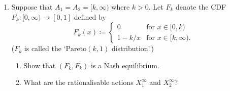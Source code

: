 \begin{exercise}
\begin{enumerate}[label=(\alph*)]
\begin{enumerate}[label=(\roman*)]
		\end{enumerate}	

		\item Suppose that $A_1 = A_2 = [k,\infty)$ where $k>0$. Let $F_k$ denote the CDF $F_k : [0,\infty) \to [0,1]$ defined by
		\begin{equation*}
			F_k(x) \coloneqq
			\begin{cases}
				0 & \text{for $x \in [0,k)$} \\
				1 - k/x & \text{for $x \in [k,\infty)$.}
			\end{cases}
		\end{equation*}
		($F_k$ is called the `$\text{Pareto}(k,1)$ distribution'.)

		\begin{enumerate}[label=(\roman*)]
		
			\item Show that $(F_k,F_k)$ is a Nash equilibrium.

			\item What are the rationalisable actions $X_1^\infty$ and $X_2^\infty$?
		
		\end{enumerate}
	
	\end{enumerate}
\end{exercise}

